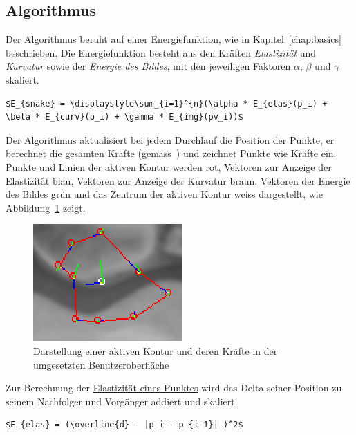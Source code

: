 \subsection{Algorithmus}
\label{subsec:realization:algo}
Der Algorithmus beruht auf einer Energiefunktion, wie in Kapitel~\ref{chap:basics} beschrieben. Die Energiefunktion besteht aus den Kräften \textit{Elastizität} und \textit{Kurvatur} sowie der \textit{Energie des Bildes}, mit den jeweiligen Faktoren \textit{$\alpha$}, \textit{$\beta$} und \textit{$\gamma$} skaliert.

\begin{lstlisting}[caption={Bei der Berechnung der Energiefunktion eines Punktes bedeuten: $p_i$ Position des Punktes $i$, $pv_i$ Farbwert des unter dem Punkt $i$ liegenden Pixels und $n$ Gesamtzahl der Punkte.\protect\footnotemark}]
    $E_{snake} = \displaystyle\sum_{i=1}^{n}(\alpha * E_{elas}(p_i) + \beta * E_{curv}(p_i) + \gamma * E_{img}(pv_i))$
\end{lstlisting}

Der Algorithmus aktualisiert bei jedem Durchlauf die Position der Punkte, er berechnet die gesamten Kräfte (gemäss~\cite[Seite 147 und 148]{hudritsch:script:cp}) und zeichnet Punkte wie Kräfte ein.\\
Punkte und Linien der aktiven Kontur werden rot, Vektoren zur Anzeige der Elastizität blau, Vektoren zur Anzeige der Kurvatur braun, Vektoren der Energie des Bildes grün und das Zentrum der aktiven Kontur weiss dargestellt, wie Abbildung~\ref{fig:ownimpl_forces} zeigt.

\begin{figure}[h!]
    \centering
    \includegraphics[scale=1.0]{images/ownimpl_forces.png}
    \caption{Darstellung einer aktiven Kontur und deren Kräfte in der umgesetzten Benutzeroberfläche\protect\footnotemark{}}
\label{fig:ownimpl_forces}
\end{figure}

Zur Berechnung der \underline{Elastizität eines Punktes} wird das Delta seiner Position zu seinem Nachfolger und Vorgänger addiert und skaliert.
\begin{lstlisting}[caption={Berechnung der Elastizität eines Punktes. Es bedeuten: $p_i$ die Position eines Punktes $i$, $\overline{d}$ die mittlere Seitenlänge zwischen zwei Punkten.\protect\footnotemark}]
    $E_{elas} = (\overline{d} - |p_i - p_{i-1}| )^2$
\end{lstlisting}

